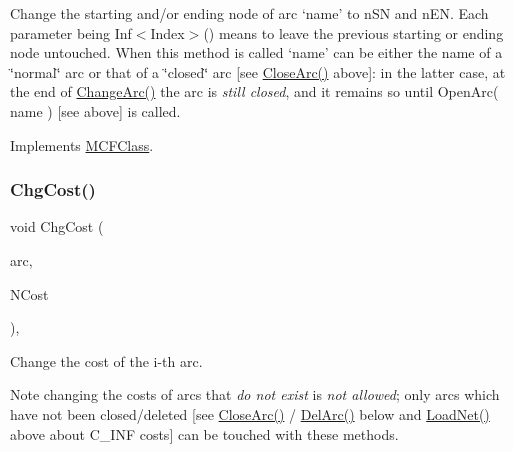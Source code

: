Change the starting and/or ending node of arc `name' to n\+SN and n\+EN. Each parameter being Inf$<$\+Index$>$() means to leave the previous starting or ending node untouched. When this method is called `name' can be either the name of a \char`\"{}normal\char`\"{} arc or that of a \char`\"{}closed\char`\"{} arc \mbox{[}see \mbox{\hyperlink{class_m_c_f_simplex_a4a964ce79159307998f5acd0018d01b1}{Close\+Arc()}} above\mbox{]}\+: in the latter case, at the end of \mbox{\hyperlink{class_m_c_f_simplex_a23980253602d1183531a93a82d6e7f96}{Change\+Arc()}} the arc is {\itshape still closed}, and it remains so until Open\+Arc( name ) \mbox{[}see above\mbox{]} is called. 

Implements \mbox{\hyperlink{class_m_c_f_class_aef2d28b0b0a2420d6b8b7093d827fa67}{M\+C\+F\+Class}}.

\mbox{\label{class_m_c_f_simplex_a5b694b932ddb1fc61d9f3d66aaca10e1}} 
\subsubsection{\texorpdfstring{Chg\+Cost()}{ChgCost()}}
{\footnotesize\ttfamily void Chg\+Cost (\begin{DoxyParamCaption}\item[{\mbox{\hyperlink{class_m_c_f_class_ad53d6229d7ec28555a9c9c2fd9abf773}{Index}}}]{arc,  }\item[{\mbox{\hyperlink{class_m_c_f_class_a07dbefeeb08c3f63073622411893eb76}{c\+C\+Number}}}]{N\+Cost }\end{DoxyParamCaption})\hspace{0.3cm}{\ttfamily [override]}, {\ttfamily [virtual]}}

Change the cost of the i-\/th arc.

\begin{DoxyNote}{Note}
changing the costs of arcs that {\itshape do not exist} is {\itshape not allowed}; only arcs which have not been closed/deleted \mbox{[}see \mbox{\hyperlink{class_m_c_f_simplex_a4a964ce79159307998f5acd0018d01b1}{Close\+Arc()}} / \mbox{\hyperlink{class_m_c_f_simplex_a3b6145c95b83f40a76d724eb2b92f80f}{Del\+Arc()}} below and \mbox{\hyperlink{class_m_c_f_simplex_ac270d18d58fd6fe88164cde1f4c80aff}{Load\+Net()}} above about C\+\_\+\+I\+NF costs\mbox{]} can be touched with these methods. 
\end{DoxyNote}


